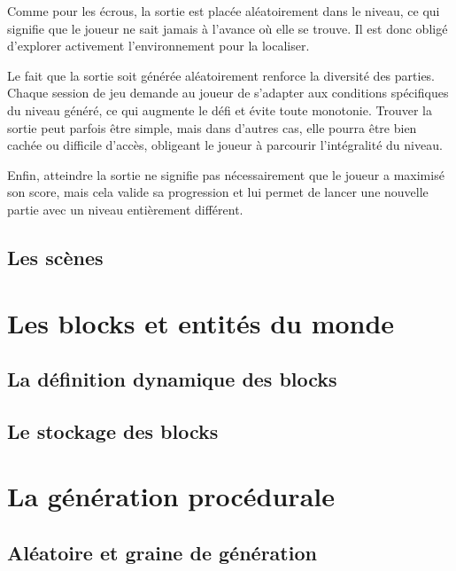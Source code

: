 \documentclass[10pt]{report}
\begin{document}
Comme pour les écrous, la sortie est placée aléatoirement dans le niveau, ce qui signifie que le joueur ne sait jamais à l’avance où elle se trouve. Il est donc obligé d’explorer activement l’environnement pour la localiser.

Le fait que la sortie soit générée aléatoirement renforce la diversité des parties. Chaque session de jeu demande au joueur de s’adapter aux conditions spécifiques du niveau généré, ce qui augmente le défi et évite toute monotonie. Trouver la sortie peut parfois être simple, mais dans d’autres cas, elle pourra être bien cachée ou difficile d’accès, obligeant le joueur à parcourir l’intégralité du niveau.

Enfin, atteindre la sortie ne signifie pas nécessairement que le joueur a maximisé son score, mais cela valide sa progression et lui permet de lancer une nouvelle partie avec un niveau entièrement différent.



\subsection{Les scènes}


\section{Les blocks et entités du monde}
\subsection{La définition dynamique des blocks}
\subsection{Le stockage des blocks}

\section{La génération procédurale}

\subsection{Aléatoire et graine de génération}
\end{document}
